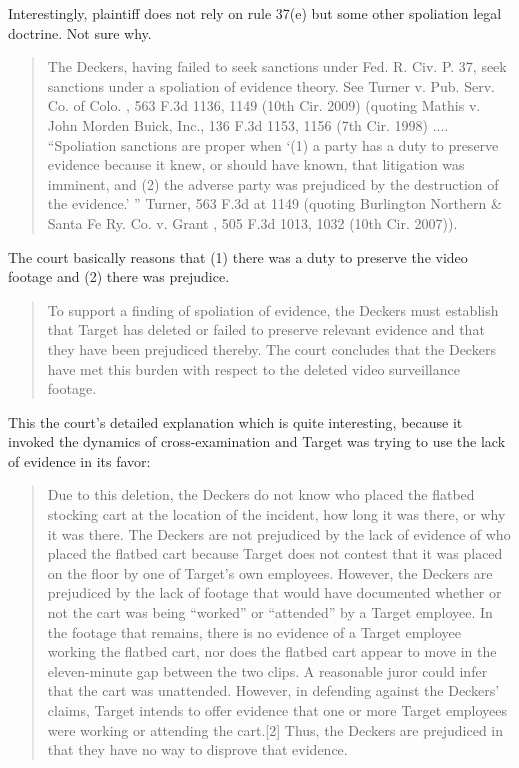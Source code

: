 \documentclass[
  10pt,
  dvipsnames,enabledeprecatedfontcommands]{scrartcl}
\begin{document}
Interestingly, plaintiff does not rely on rule 37(e) but some other
spoliation legal doctrine. Not sure why.

\begin{quote}
The Deckers, having failed to seek sanctions under Fed. R. Civ. P. 37, seek sanctions under a spoliation of
evidence theory. See Turner v. Pub. Serv. Co. of Colo. , 563 F.3d 1136, 1149 (10th Cir. 2009) (quoting Mathis v. John Morden Buick, Inc., 136 F.3d 1153, 1156 (7th Cir. 1998) .... “Spoliation
sanctions are proper when ‘(1) a party has a duty to preserve evidence because it knew, or should have
known, that litigation was imminent, and (2) the adverse party was prejudiced by the destruction of the
evidence.’ ” Turner, 563 F.3d at 1149 (quoting Burlington Northern \& Santa Fe Ry. Co. v. Grant , 505 F.3d
1013, 1032 (10th Cir. 2007)).
\end{quote}

The court basically reasons that (1) there was a duty to preserve the
video footage and (2) there was prejudice.

\begin{quote}
To support a finding of spoliation of evidence, the Deckers must establish that Target has deleted or failed to preserve relevant evidence and that they have been prejudiced thereby. The court concludes that the
Deckers have met this burden with respect to the deleted video surveillance footage.
\end{quote}

This the court's detailed explanation which is quite interesting,
because it invoked the dynamics of cross-examination and Target was
trying to use the lack of evidence in its favor:

\begin{quote}
Due to this deletion, the Deckers do not know who placed the flatbed stocking cart at the location of the
incident, how long it was there, or why it was there. The Deckers are not prejudiced by the lack of evidence of who placed the flatbed cart because Target does not contest that it was placed on the floor by one of Target’s own employees. However, the Deckers are prejudiced by the lack of footage that would have documented  whether or not the cart was being “worked” or “attended” by a Target employee. In the footage that remains, there is no evidence of a Target employee working the flatbed cart, nor does the flatbed cart appear to move in the eleven-minute gap between the two clips. A reasonable juror could infer that the cart was unattended. However, in defending against the Deckers’ claims, Target intends to offer evidence that one or more Target employees were working or attending the cart.[2] Thus, the Deckers are prejudiced in that they have no way to disprove that evidence.
\end{quote}
\end{document}
